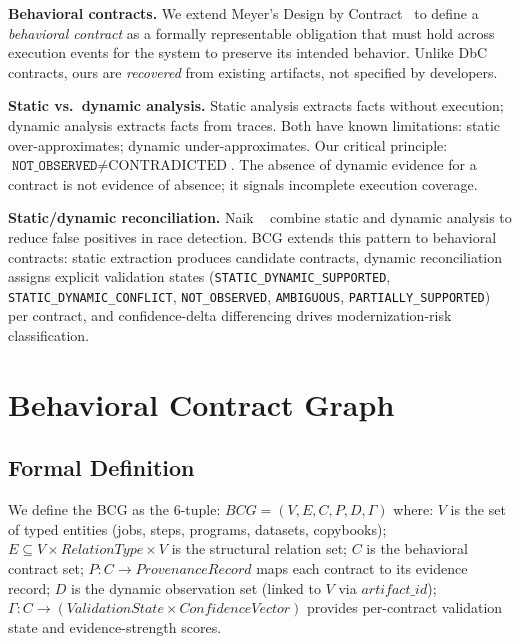 \documentclass[sigconf,anonymous,review]{acmart}
\newcommand{\bcg}{\textsc{BCG}\xspace}
\newcommand{\notobs}{\texttt{NOT\_OBSERVED}\xspace}
\newcommand{\supported}{\texttt{STATIC\_DYNAMIC\_SUPPORTED}\xspace}
\newcommand{\conflict}{\texttt{STATIC\_DYNAMIC\_CONFLICT}\xspace}
\newcommand{\ambiguous}{\texttt{AMBIGUOUS}\xspace}
\newcommand{\partiallysupported}{\texttt{PARTIALLY\_SUPPORTED}\xspace}
\begin{document}
\textbf{Behavioral contracts.}
We extend Meyer's Design by Contract~\cite{meyer1992applying} to define a
\emph{behavioral contract} as a formally representable obligation that must hold
across execution events for the system to preserve its intended behavior.
Unlike DbC contracts, ours are \emph{recovered} from existing artifacts, not
specified by developers.

\textbf{Static vs.\ dynamic analysis.}
Static analysis extracts facts without execution; dynamic analysis extracts facts
from traces.
Both have known limitations: static over-approximates; dynamic under-approximates.
Our critical principle: $\notobs \neq \text{CONTRADICTED}$.
The absence of dynamic evidence for a contract is not evidence of absence; it signals
incomplete execution coverage.

\textbf{Static/dynamic reconciliation.}
Naik \etal~\cite{naik2006race} combine static and dynamic analysis to reduce
false positives in race detection.
BCG extends this pattern to behavioral contracts: static extraction produces candidate
contracts, dynamic reconciliation assigns explicit validation states
(\supported, \conflict, \notobs, \ambiguous, \partiallysupported) per contract, and
confidence-delta differencing drives modernization-risk classification.

\section{Behavioral Contract Graph}\label{sec:bcg}

\subsection{Formal Definition}

We define the \bcg as the 6-tuple:
$\mathit{BCG} = (V, E, C, P, D, \Gamma)$
where:
$V$ is the set of typed entities (jobs, steps, programs, datasets, copybooks);
$E \subseteq V \times \mathit{RelationType} \times V$ is the structural relation set;
$C$ is the behavioral contract set;
$P: C \to \mathit{ProvenanceRecord}$ maps each contract to its evidence record;
$D$ is the dynamic observation set (linked to $V$ via $\mathit{artifact\_id}$);
$\Gamma: C \to (\mathit{ValidationState} \times \mathit{ConfidenceVector})$ provides
per-contract validation state and evidence-strength scores.
\end{document}
